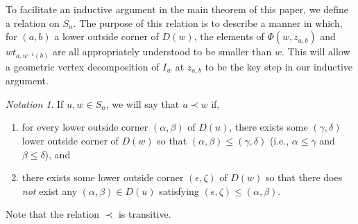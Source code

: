 \documentclass[12pt,reqno]{amsart}
\newtheorem{Main Conjecture}[theorem]{Main Conjecture}
\theoremstyle{remark}
\newtheorem{notation}[theorem]{Notation}
\theoremstyle{plain}
\begin{document}
To facilitate an inductive argument in the main theorem of this paper, we define a relation on $S_n$.  The purpose of this relation is to describe a manner in which, for $(a,b)$ a lower outside corner of $D(w)$, the elements of $\Phi(w,z_{a,b})$ and $wt_{a,w^{-1}(b)}$ are all appropriately understood to be smaller than $w$.  This will allow a geometric vertex decomposition of $I_w$ at $z_{a,b}$ to be the key step in our inductive argument.

\begin{notation}\label{not:indOrder} If $u,w \in S_n$, we will say that $u \prec w$ if, \begin{enumerate} 
\item for every lower outside corner $(\alpha,\beta)$ of $D(u)$, there exists some $(\gamma,\delta)$ lower outside corner of $D(w)$ so that $(\alpha,\beta) \leq (\gamma,\delta)$ (i.e., $\alpha \leq \gamma$ and $\beta \leq \delta$), and 
\item there exists some lower outside corner $(\epsilon, \zeta)$ of $D(w)$ so that there does \emph{not} exist any $(\alpha,\beta) \in D(u)$ satisfying $(\epsilon, \zeta) \leq (\alpha, \beta)$.
\end{enumerate} Note that the relation $\prec$ is transitive.    
\end{notation}
\end{document}
